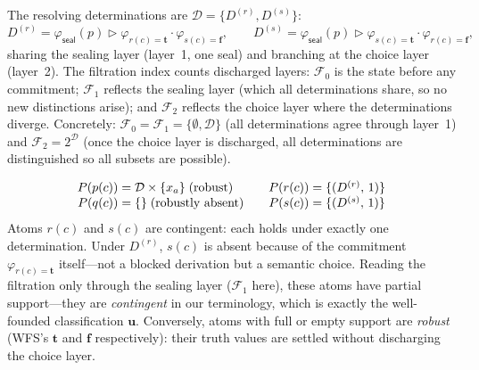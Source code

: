 \documentclass[acmsmall,review,anonymous]{acmart}
\newcommand{\seal}{\mathsf{seal}}
\newcommand{\seq}{\mathbin{\triangleright}}
\theoremstyle{remark}
\numberwithin{definition}{section}
\numberwithin{theorem}{section}
\numberwithin{lemma}{section}
\numberwithin{corollary}{section}
\numberwithin{remark}{section}
\numberwithin{example}{section}
\numberwithin{observation}{section}
\numberwithin{assumption}{section}
\begin{document}
The resolving determinations are $\mathcal{D} = \{D^{(r)}, D^{(s)}\}$:
\[
  D^{(r)} = \varphi_{\seal}(p) \seq
    \varphi_{r(c)=\mathbf{t}} \cdot \varphi_{s(c)=\mathbf{f}},
  \qquad
  D^{(s)} = \varphi_{\seal}(p) \seq
    \varphi_{s(c)=\mathbf{t}} \cdot \varphi_{r(c)=\mathbf{f}},
\]
sharing the sealing layer (layer~1, one seal) and branching
at the choice layer (layer~2).
The filtration index counts discharged layers:
$\mathcal{F}_0$ is the state before any commitment;
$\mathcal{F}_1$ reflects the sealing layer
(which all determinations share, so no new distinctions arise); and
$\mathcal{F}_2$ reflects the choice layer where the determinations
diverge.
Concretely:
$\mathcal{F}_0 = \mathcal{F}_1 = \{\emptyset, \mathcal{D}\}$
(all determinations agree through layer~1)
and $\mathcal{F}_2 = 2^{\mathcal{D}}$ (once the choice layer is
discharged, all determinations are distinguished so all subsets are possible).

\[
  \begin{array}{r@{\;=\;}l@{\qquad}r@{\;=\;}l}
    P(p(c)) & \mathcal{D} \times \{x_a\} \;\text{(robust)} &
    P(r(c)) & \{(D^{(r)},\, 1)\} \\
    P(q(c)) & \{\} \;\text{(robustly absent)} &
    P(s(c)) & \{(D^{(s)},\, 1)\}
  \end{array}
\]
Atoms $r(c)$ and $s(c)$ are contingent: each holds under exactly one
determination.
Under $D^{(r)}$, $s(c)$ is absent because of the commitment
$\varphi_{r(c)=\mathbf{t}}$ itself---not a blocked derivation but a
semantic choice.
Reading the filtration only through the sealing layer
($\mathcal{F}_1$ here), these atoms have partial support---they are
\emph{contingent} in our terminology, which is exactly the
well-founded classification $\mathbf{u}$.
Conversely, atoms with full or empty support are \emph{robust}
(WFS's $\mathbf{t}$ and $\mathbf{f}$ respectively): their truth
values are settled without discharging the choice layer.
\end{document}

